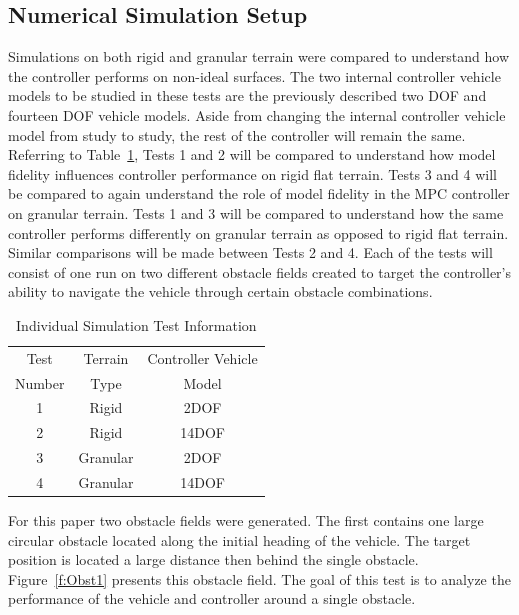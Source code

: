\documentclass[12pt,twocolumn]{article}
\begin{document}
\subsection{Numerical Simulation Setup }\label{ss:Setup}
Simulations on both rigid and granular terrain were compared to understand how the controller performs on non-ideal surfaces.  The two internal controller vehicle models to be studied in these tests are the previously described two DOF and fourteen DOF vehicle models. Aside from changing the internal controller vehicle model from study to study, the rest of the controller will remain the same. Referring to Table~\ref{t:TestMatrix}, Tests 1 and 2 will be compared to understand how model fidelity influences controller performance on rigid flat terrain. Tests 3 and 4 will be compared to again understand the role of model fidelity in the MPC controller on granular terrain. Tests 1 and 3 will be compared to understand how the same controller performs differently on granular terrain as opposed to rigid flat terrain. Similar comparisons will be made between Tests 2 and 4. Each of the tests will consist of one run on two different obstacle fields created to target the controller’s ability to navigate the vehicle through certain obstacle combinations.

\begin{table}
\begin{center}
	\begin{tabular}{||c |c | c||} 
		\hline
		Test  & Terrain  & Controller Vehicle \\
		Number &  Type & Model\\ [0.5ex] 	
		\hline\hline
		1 & Rigid & 2DOF \\ 
		\hline
		2 & Rigid & 14DOF \\
		\hline
		3 & Granular & 2DOF \\
		\hline
		4 & Granular & 14DOF \\
		\hline
	\end{tabular}
\end{center}
\caption{Individual Simulation Test Information}
\label{t:TestMatrix}
\end{table}

For this paper two obstacle fields were generated. The first contains one large circular obstacle located along the initial heading of the vehicle. The target position is located a large distance then behind the single obstacle. Figure~\ref{f:Obst1} presents this obstacle field. The goal of this test is to analyze the performance of the vehicle and controller around a single obstacle. 
\end{document}
